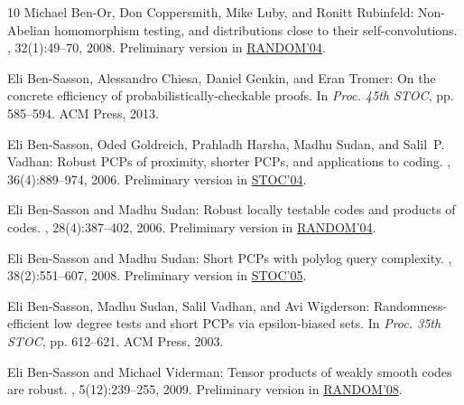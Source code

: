 \documentclass[11pt]{article}
\numberwithin{equation}{section}
\theoremstyle{definition}
\theoremstyle{plain}
\theoremstyle{plain}
\begin{document}
\begin{thebibliography}{10}
{\sc Michael {Ben-Or}, Don Coppersmith, Mike Luby, and Ronitt Rubinfeld}:
  Non-{A}belian homomorphism testing, and distributions close to their
  self-convolutions.
, 32(1):49--70, 2008.
\newblock Preliminary version in
  \href{https://doi.org/10.1007/978-3-540-27821-4\_25}{RANDOM'04}.

{\sc Eli {Ben-Sasson}, Alessandro Chiesa, Daniel Genkin, and Eran Tromer}: On
  the concrete efficiency of probabilistically-checkable proofs.
\newblock In {\em Proc. 45th STOC}, pp. 585--594. ACM Press, 2013.
\newblock [\epfmtdoi{10.1145/2488608.2488681}]

{\sc Eli {Ben-Sasson}, Oded Goldreich, Prahladh Harsha, Madhu Sudan, and
  Salil~P. Vadhan}: Robust {PCP}s of proximity, shorter {PCP}s, and
  applications to coding.
, 36(4):889--974, 2006.
\newblock Preliminary version in
  \href{https://doi.org/10.1145/1007352.1007361}{STOC'04}.
\newblock [\epfmtdoi{10.1137/S0097539705446810}]

{\sc Eli {Ben-Sasson} and Madhu Sudan}: Robust locally testable codes and
  products of codes.
, 28(4):387--402, 2006.
\newblock Preliminary version in
  \href{https://doi.org/10.1007/978-3-540-27821-4\_26}{RANDOM'04}.

{\sc Eli {Ben-Sasson} and Madhu Sudan}: Short {PCP}s with polylog query
  complexity.
, 38(2):551--607, 2008.
\newblock Preliminary version in
  \href{https://doi.org/10.1145/1060590.1060631}{STOC'05}.
\newblock [\epfmtdoi{10.1137/050646445}]

{\sc Eli {Ben-Sasson}, Madhu Sudan, Salil Vadhan, and Avi Wigderson}:
  Randomness-efficient low degree tests and short {PCP}s via epsilon-biased
  sets.
\newblock In {\em Proc. 35th STOC}, pp. 612--621. ACM Press, 2003.
\newblock [\epfmtdoi{10.1145/780542.780631}]

{\sc Eli {Ben-Sasson} and Michael Viderman}: Tensor products of weakly smooth
  codes are robust.
, 5(12):239--255, 2009.
\newblock Preliminary version in
  \href{https://doi.org/10.1007/978-3-540-85363-3\_24}{RANDOM'08}.


\end{thebibliography}
\end{document}
